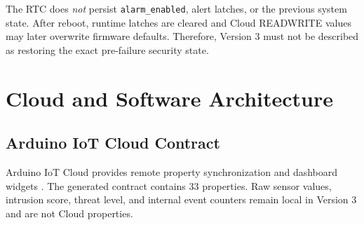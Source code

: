 \documentclass[11pt,a4paper]{report}
\begin{document}
The RTC does \emph{not} persist \texttt{alarm\_enabled}, alert latches, or the
previous system state. After reboot, runtime latches are cleared and Cloud
READWRITE values may later overwrite firmware defaults. Therefore, Version 3
must not be described as restoring the exact pre-failure security state.

\chapter{Cloud and Software Architecture}

\section{Arduino IoT Cloud Contract}
Arduino IoT Cloud provides remote property synchronization and dashboard
widgets \cite{arduino-cloud,arduino-iot-lib}. The generated contract contains
33 properties. Raw sensor values, intrusion score, threat level, and internal
event counters remain local in Version 3 and are not Cloud properties.
\end{document}
